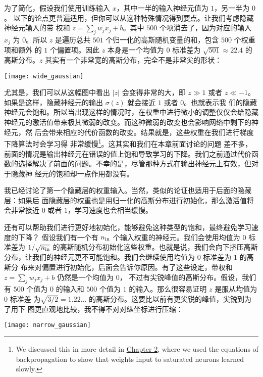 为了简化，假设我们使用训练输入 $x$，其中一半的输入神经元值为 $1$，另一半为 $0$。
以下的论点更普遍适用，但你可以从这种特殊情况得到要点。让我们考虑隐藏神经元输入的带
权和 $z=\sum_j w_j x_j + b$。其中 $500$ 个项消去了，因为对应的输入
$x_j$ 为 $0$。所以 $z$ 是遍历总共 $501$ 个归一化的高斯随机变量的和，包含 $500$ 个权重项和额外
的 $1$ 个偏置项。因此 $z$ 本身是一个均值为 $0$ 标准差为 $\sqrt{501} \approx 22.4$
的高斯分布。$z$ 其实有一个非常宽的高斯分布，完全不是非常尖的形状：
\begin{center}
  \texttt{[image: wide\_gaussian]}
\end{center}

尤其是，我们可以从这幅图中看出 $|z|$ 会变得非常的大，即 $z \gg 1$ 或者 $z \ll
-1$。如果是这样，隐藏神经元的输出 $\sigma(z)$ 就会接近 $1$ 或者 $0$。也就表示我
们的隐藏神经元会饱和。所以当出现这样的情况时，在权重中进行微小的调整仅仅会给隐藏
神经元的激活值带来极其微弱的改变。而这种微弱的改变也会影响网络中剩下的神经元，然
后会带来相应的代价函数的改变。结果就是，这些权重在我们进行梯度下降算法时会学习得
非常缓慢\footnote{We discussed this in more detail in
  \hyperref[sec:the_four_fundamental_equations_behind_backpropagation]{Chapter
    2}, where we used the equations of backpropagation to show that weights
  input to saturated neurons learned slowly.}。这其实和我们在本章前面讨论的问题
差不多，前面的情况是输出神经元在错误的值上饱和导致学习的下降。我们之前通过代价函
数的选择解决了前面的问题。不幸的是，尽管那种方式在输出神经元上有效，但对于隐藏神
经元的饱和却一点作用都没有。

我已经讨论了第一个隐藏层的权重输入。当然，类似的论证也适用于后面的隐藏层：如果后
面隐藏层的权重也是用归一化的高斯分布进行初始化，那么激活值将会非常接近 $0$ 或者
$1$，学习速度也会相当缓慢。

还有可以帮助我们进行更好地初始化，能够避免这种类型的饱和，最终避免学习速度的下降？
假设我们有一个有 $n_{\rm in}$ 个输入权重的神经元。我们会使用均值为 $0$ 标准差为
$1/\sqrt{n_{\rm in}}$ 的高斯随机分布初始化这些权重。也就是说，我们会向下挤压高斯
分布，让我们的神经元更不可能饱和。我们会继续使用均值为 $0$ 标准差为 $1$ 的高斯分
布来对偏置进行初始化，后面会告诉你原因。有了这些设定，带权和 $z = \sum_j w_j x_j
+ b$ 仍然是一个均值为 $0$， 不过有尖锐峰值的高斯分布。假设，我们有 $500$ 个值为
$0$ 的输入和 $500$ 个值为 $1$ 的输入。那么很容易证明 $z$ 是服从均值为 $0$ 标准差
为$\sqrt{3/2} = 1.22\ldots$ 的高斯分布。这要比以前有更尖锐的峰值，尖锐到为了用下
图更直观地比较，我不得不对对纵坐标进行压缩：
\begin{center}
  \texttt{[image: narrow\_gaussian]}
\end{center}

